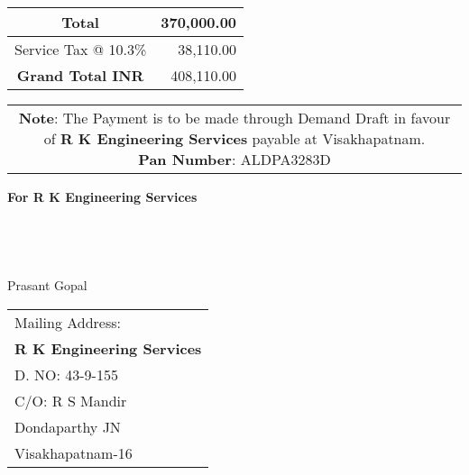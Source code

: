 \documentclass[11pt]{article}
\begin{document}
\vspace*{0.2cm}

\hspace*{11.8cm}
\begin{tabular}{|c|r|}
\hline
Total & 370,000.00 \\
\hline
Service Tax @ 10.3\% & 38,110.00 \\
\hline
{\bf Grand Total INR} & 408,110.00 \\
\hline
\end{tabular}

\vspace*{-1 cm}
\begin{tabular}{c}
\parbox{4in}{ {\bf Note}: The Payment is to be made through Demand Draft in favour of {\bf R K Engineering Services} payable at Visakhapatnam. \\
{\noindent \bf Pan Number}:  ALDPA3283D }\\
\end{tabular}
\vspace*{55pt}


{\bf For  R K Engineering Services } \\ \\ \\ \\ \\
 \hspace*{0.6cm}Prasant Gopal
\vspace*{-71pt}
\begin{flushright}
\begin{tabular}{l}
Mailing Address:\\
{\bf R K Engineering Services}\\
D. NO: 43-9-155\\
C/O: R  S Mandir\\
Dondaparthy JN\\ 
Visakhapatnam-16\\
\end{tabular}
\end{flushright}
\end{document}
